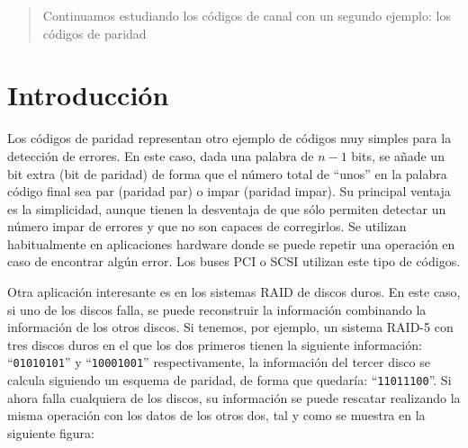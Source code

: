 \documentclass[es,practica,12pt]{uah}
\begin{document}

\maketitle

\begin{abstract}
	Continuamos estudiando los códigos de canal con un segundo ejemplo: los códigos de paridad
\end{abstract}

\section{Introducción}

Los códigos de paridad representan otro ejemplo de códigos muy simples para la detección de errores. En este caso, dada una palabra de $n-1$ bits, se añade un bit extra (bit de paridad) de forma que el número total de ``unos'' en la palabra código final sea par (paridad par)
 o impar (paridad impar). Su principal ventaja es la simplicidad, aunque tienen la desventaja de que sólo permiten detectar un número impar de errores y que no son capaces de corregirlos. Se utilizan habitualmente en aplicaciones hardware donde se puede repetir una operación en caso de encontrar algún error. Los buses PCI o SCSI utilizan este tipo de códigos.
 
 Otra aplicación interesante es en los sistemas RAID de discos duros. En este caso, si uno de los discos falla, se puede reconstruir la información combinando la información de los otros discos. Si tenemos, por ejemplo, un sistema RAID-5 con tres discos duros en el que los dos primeros tienen la siguiente información: ``\texttt{01010101}'' y ``\texttt{10001001}'' respectivamente, la información del tercer disco se calcula siguiendo un esquema de paridad, de forma que quedaría: ``\texttt{11011100}''. Si ahora falla cualquiera de los discos, su información se puede rescatar realizando la misma operación con los datos de los otros dos, tal y como se muestra en la siguiente figura:
\end{document}
